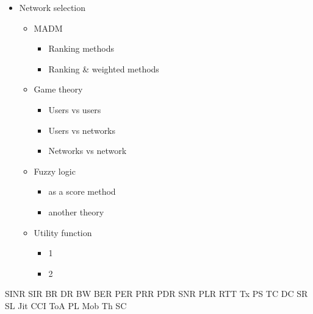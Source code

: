 \begin{itemize}
	\item Network selection
	\begin{itemize}
		\item MADM
		\begin{itemize}
			\item Ranking methods
			\item Ranking \& weighted methods
		\end{itemize}
		\item Game theory
		\begin{itemize}
			\item Users vs users
			\item Users vs networks
			\item Networks vs network
		\end{itemize}
		\item Fuzzy logic
		\begin{itemize}
			\item as a score method
			\item another theory
		\end{itemize}
		\item Utility function
		\begin{itemize}
			\item 1
			\item 2
		\end{itemize}
	\end{itemize}
\end{itemize}


\ac{SINR}
\ac{SIR}
\ac{BR}
\ac{DR}
\ac{BW}
\ac{BER}
\ac{PER}
\ac{PRR}
\ac{PDR}
\ac{SNR}
\ac{PLR}
\ac{RTT}
\ac{Tx}
\ac{PS}
\ac{TC}
\ac{DC}
\ac{SR}
\ac{SL}
\ac{Jit}
\ac{CCI}
\ac{ToA}
\ac{PL}
\ac{Mob}
\ac{Th}
\ac{SC}


